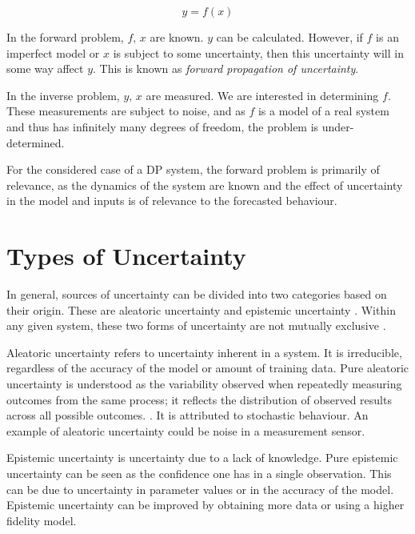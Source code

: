 \begin{equation}
\label{eq:general_model}
y = f(x)
\end{equation}

In the forward problem, \(f, \, x \) are known. \(y\) can be calculated. However, if \(f\) is an imperfect model or
\(x\) is subject to some uncertainty, then this uncertainty will in some way affect \(y\). This is known as
\textit{forward propagation of uncertainty}.

In the inverse problem, \(y, \, x\) are measured. We are interested in determining \(f\). These measurements are subject to noise, and as \(f\) is a model of a
real system and thus has infinitely many degrees of freedom, the problem is under-determined. 

For the considered case of a DP system, the forward problem is primarily of relevance, as the dynamics of the system are
known and the effect of uncertainty in the model and inputs is of relevance to the forecasted behaviour.

\section{Types of Uncertainty}
\label{sec:types_of_uncertainty}
In general, sources of uncertainty can be divided into two categories based on their origin. These are aleatoric
uncertainty and epistemic uncertainty \parencite{sullivanIntroductionUncertaintyQuantification2015}. Within any given system, these two forms of uncertainty are not mutually exclusive
\parencite{foxDistinguishingTwoDimensions2011}. 

Aleatoric uncertainty refers to uncertainty inherent in a system. It is irreducible, regardless of the accuracy of the
model or amount of training data. Pure aleatoric uncertainty is understood as the variability observed when repeatedly measuring outcomes from the same process; it reflects the distribution of observed results across all possible outcomes. \parencite{foxDistinguishingTwoDimensions2011}. It is attributed to stochastic behaviour. An example of aleatoric uncertainty could be noise in a measurement sensor. 

Epistemic uncertainty is uncertainty due to a lack of knowledge. Pure epistemic uncertainty can be seen as the
confidence one has in a single observation.
This can be due to uncertainty in parameter values or
in the accuracy of the model. Epistemic uncertainty can be improved by obtaining more data or using a higher fidelity
model. 

